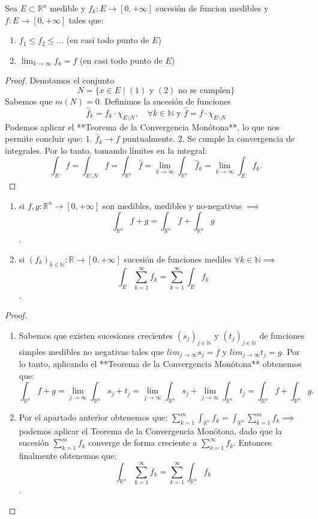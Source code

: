 \begin{teorema}
    Sea $E \subset \mathbb{R}^n$ medible y $f_k: E \to [0, +\infty]$ sucesión de funcion medibles y $f: E \to [0, +\infty]$ tales que: 
    \begin{enumerate}
        \item $f_1 \leq f_2 \leq \dots$ (en casi todo punto de $E$)
        \item $\lim_{k \to \infty}f_k = f$ (en casi todo punto de $E$)
    \end{enumerate}
\end{teorema}
\begin{proof}
    Denotamos el conjunto $$ N = \{ x \in E \mid (1) \text{ y } (2) \text{ no se cumplen} \} $$
    Sabemos que \( m(N) = 0 \). Definimos la sucesión de funciones $$ \hat{f}_k = f_k \cdot \chi_{E \setminus  N}, \quad \forall k \in \mathbb{N} \text{ y } \hat{f} = f \cdot \chi_{E\setminus N}$$
    Podemos aplicar el **Teorema de la Convergencia Monótona**, lo que nos permite concluir que:
    1. \( \hat{f}_k \to f \) puntualmente.
    2. Se cumple la convergencia de integrales.
    Por lo tanto, tomando límites en la integral:
    $$ \int_E f = \int_{E \setminus N} f = \int_{\mathbb{R}^n}\hat{f} = \lim_{k \to \infty} \int_{\mathbb{R}^n} \hat{f}_k = \lim_{k \to \infty} \int_E f_k. $$
\end{proof}
\begin{corolario}
    \begin{enumerate}
        \item si $f, g: \mathbb{R}^n \to [0, +\infty]$ son medibles, medibles y no-negativas $\implies$ $$\int_{\mathbb{R}^n}f+g = \int_{\mathbb{R}^n}f + \int_{\mathbb{R}^n}g$$.
        \item si $(f_k)_{k\in \mathbb{N}}: \mathbb{R} \to [0, +\infty]$ sucesión de funciones mediles $\forall k \in \mathbb{N} \implies$ $$\int_{E}\sum_{k=1}^{\infty}f_k = \sum_{k=1}^{\infty}\int_{E}f_k$$.
    \end{enumerate}
\end{corolario}
\begin{proof}
    \begin{enumerate}
    \item Sabemos que existen sucesiones crecientes \( (s_j)_{j \in \mathbb{N}} \) y \( (t_j)_{j \in \mathbb{N}} \) de funciones simples medibles no negativas tales que $lim_{j \to \infty} s_j = f$ y $lim_{j \to \infty} t_j = g$. Por lo tanto, aplicando el **Teorema de la Convergencia Monótona** obtenemos que:
    $$ \int_{\mathbb{R}^n}f+g = \lim_{j\to \infty}\int_{\mathbb{R}^n}s_j + t_j = \lim_{j\to \infty}\int_{\mathbb{R}^n}s_j + \lim_{j\to \infty}\int_{\mathbb{R}^n}t_j = \int_{\mathbb{R}^n}f + \int_{\mathbb{R}^n}g. $$
    \item  Por el apartado anterior obtenemos que: $\sum_{k = 1}^{m}\int_{\mathbb{R}^n}f_k = \int_{\mathbb{R}^n}\sum_{k = 1}^{m}f_k \implies$ podemos aplicar el Teorema de la Convergencia Monótona, dado que la sucesión  $\sum_{k = 1}^{m}f_k $ converge de forma creciente a $\sum_{k = 1}^{\infty}f_k$. Entonces finalmente obtenemos que: $$\int_{\mathbb{R}^n}\sum_{k = 1}^{\infty}f_k = \sum_{k = 1}^{\infty}\int_{\mathbb{R}^n}f_k$$.
    \end{enumerate}
\end{proof}
